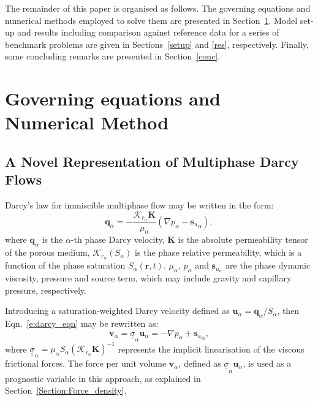 \documentclass[preprint,authoryear,12pt]{elsarticle}
\begin{document}
The remainder of this paper is organised as follows. The governing
equations and numerical methods employed to solve them are presented
in Section~\ref{overlapping_method_section}. Model set-up and results
including comparison against reference data for a series of benchmark
problems are given in Sections~\ref{setup} and \ref{res},
respectively. Finally, some concluding remarks are presented in
Section~\ref{conc}.


\section{Governing equations and Numerical Method}
\label{overlapping_method_section}

\subsection{A Novel Representation of Multiphase Darcy Flows}
Darcy's law for immiscible multiphase flow may be written in the form:
\begin{equation}\label{e:darcy_eqn}
  \mathbf{q}_{\alpha} =
  -\frac{\mathcal{K}_{{r}_\alpha}\mathbf{K}}{\mu_{\alpha}}\left(
  \nabla p_{\alpha} - {\mathbf{s}_{u}}_{\alpha} \right),
\end{equation}
where $\mathbf{q}_{\alpha}$ is the $\alpha$-th phase Darcy velocity,
$\mathbf{K}$ is the absolute permeability tensor of the porous medium,
$\mathcal{K}_{{r}_\alpha}\left(S_{\alpha}\right)$ is the phase
relative permeability, which is a function of the phase saturation
$S_{\alpha}\left(\mathbf{r},t\right)$. $\mu_{\alpha}$, $p_{\alpha}$
and $\mathbf{s}_{{u}_\alpha}$ are the phase dynamic viscosity,
pressure and source term, which may include gravity and capillary
pressure, respectively.

Introducing a saturation-weighted Darcy velocity defined as
$\mathbf{u}_\alpha= \mathbf{q}_\alpha/S_\alpha$, then
Eqn.~\ref{e:darcy_eqn} may be rewritten as:
\begin{equation}
  \mathbf{v}_\alpha={\underline {\underline \sigma}}_{\alpha}
  \mathbf{u}_{\alpha} = - \nabla p_{\alpha} +
         {\mathbf{s}_{u}}_{\alpha},
  \label{force-bal}
\end{equation}
where ${\underline {\underline \sigma}}_{\alpha}=\mu_\alpha S_\alpha
\left(\mathcal{K}_{{r}_\alpha}\mathbf{K}\right)^{-1}$ represents the
implicit linearisation of the viscous frictional forces. The force per
unit volume $\mathbf{v}_\alpha$, defined as ${\underline {\underline
    \sigma}}_{\alpha} \mathbf{u}_\alpha$, is used as a prognostic
variable in this approach, as explained in
Section~\ref{Section:Force_density}.
\end{document}
